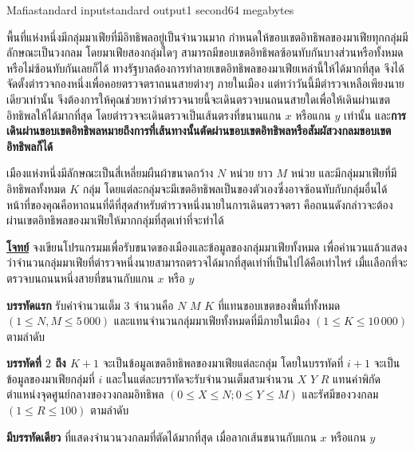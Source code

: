 \documentclass[11pt,a4paper]{article}
\begin{document}
\begin{problem}{Mafia}{standard input}{standard output}{1 second}{64 megabytes}

พื้นที่แห่งหนึ่งมีกลุ่มมาเฟียที่มีอิทธิพลอยู่เป็นจำนวนมาก กำหนดให้ขอบเขตอิทธิพลของมาเฟียทุกกลุ่มมีลักษณะเป็นวงกลม โดยมาเฟียสองกลุ่มใดๆ สามารถมีขอบเขตอิทธิพลซ้อนทับกันบางส่วนหรือทั้งหมดหรือไม่ซ้อนทับกันเลยก็ได้ ทางรัฐบาลต้องการทำลายเขตอิทธิพลของมาเฟียเหล่านี้ให้ได้มากที่สุด จึงได้จัดตั้งตำรวจกองหนึ่งเพื่อคอยตรวจตราถนนสายต่างๆ ภายในเมือง แต่ทว่าวันนี้มีตำรวจเหลือเพียงนายเดียวเท่านั้น จึงต้องการให้คุณช่วยหาว่าตำรวจนายนี้จะเดินตรวจบนถนนสายใดเพื่อให้เดินผ่านเขตอิทธิพลให้ได้มากที่สุด โดยตำรวจจะเดินตรวจเป็นเส้นตรงที่ขนานแกน $x$ หรือแกน $y$ เท่านั้น และ\textbf{การเดินผ่านขอบเขตอิทธิพลหมายถึงการที่เส้นทางนั้นตัดผ่านขอบเขตอิทธิพลหรือสัมผัสวงกลมขอบเขตอิทธิพลก็ได้}

เมืองแห่งหนึ่งมีลักษณะเป็นสี่เหลี่ยมผืนผ้าขนาดกว้าง $N$ หน่วย ยาว $M$ หน่วย และมีกลุ่มมาเฟียที่มีอิทธิพลทั้งหมด $K$ กลุ่ม โดยแต่ละกลุ่มจะมีเขตอิทธิพลเป็นของตัวเองซึ่งอาจซ้อนทับกับกลุ่มอื่นได้ หน้าที่ของคุณคือหาถนนที่ดีที่สุดสำหรับตำรวจหนึ่งนายในการเดินตรวจตรา คือถนนดังกล่าวจะต้องผ่านเขตอิทธิพลของมาเฟียให้มากกลุ่มที่สุดเท่าที่จะทำได้

\bigskip
\underline{\textbf{โจทย์}}  จงเขียนโปรแกรมมเพื่อรับขนาดของเมืองและข้อมูลของกลุ่มมาเฟียทั้งหมด เพื่อคำนวนแล้วแสดงว่าจำนวนกลุ่มมาเฟียที่ตำรวจหนึ่งนายสามารถตรวจได้มากที่สุดเท่าที่เป็นไปได้คือเท่าไหร่ เมื่แเลือกที่จะตรวจบนถนนหนึ่งสายที่ขนานกับแกน $x$ หรือ $y$

\InputFile
\textbf{บรรทัดแรก} รับค่าจำนวนเต็ม $3$ จำนวนคือ $N$ $M$ $K$ ที่แทนขอบเขตของพื้นที่ทั้งหมด $(1 \leq N, M \leq 5\,000)$ และแทนจำนวนกลุ่มมาเฟียทั้งหมดที่มีภายในเมือง $(1 \leq K \leq 10\,000)$ ตามลำดับ

\textbf{บรรทัดที่ $2$ ถึง $K+1$} จะเป็นข้อมูลเขตอิทธิพลของมาเฟียแต่ละกลุ่ม โดยในบรรทัดที่ $i+1$ จะเป็นข้อมูลของมาเฟียกลุ่มที่ $i$ และในแต่ละบรรทัดจะรับจำนวนเต็มสามจำนวน $X$ $Y$ $R$ แทนค่าพิกัดตำแหน่งจุดศูนย์กลางของวงกลมอิทธิพล $(0 \leq X \leq N;  0 \leq Y \leq M)$  และรัศมีของวงกลม $(1 \leq R \leq 100)$ ตามลำดับ

\OutputFile

\textbf{มีบรรทัดเดียว} ที่แสดงจำนวนวงกลมที่ตัดได้มากที่สุด เมื่อลากเส้นขนานกับแกน $x$ หรือแกน $y$
\Examples

\begin{example}
%
\end{example}

\Note 


\end{problem}
\end{document}
